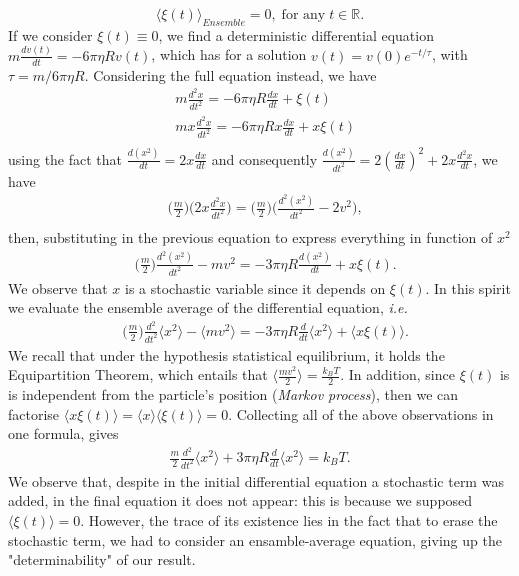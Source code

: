 \[
	\langle \xi(t)\rangle_{Ensemble}=0, \;\mathrm{for}\,\,\mathrm{any}\; t\in \mathbb{R}.
\]
If we consider $\xi(t)\equiv 0$, we find a deterministic differential equation $m\frac{dv(t)}{dt}=-6\pi\eta R v(t)$, which has for a solution $v(t)=v(0)e^{-t/\tau}$, with $\tau=m/6\pi\eta R$. Considering the full equation instead, we have
\begin{align*}
	&m\frac{d^2x}{dt^2}=-6\pi\eta R\frac{dx}{dt}+\xi(t)\\
	& mx\frac{d^2x}{dt^2}=-6\pi\eta Rx\frac{dx}{dt}+x\xi(t)\\
\end{align*}
using the fact that $\frac{d(x^2)}{dt}=2x\frac{dx}{dt}$ and consequently $\frac{d(x^2)}{dt^2}=2(\frac{dx}{dt})^2+2x\frac{d^2x}{dt}$, we have
\begin{align*}
	&\bigg(\frac{m}{2}\bigg)\bigg(2x\frac{d^2x}{dt^2}\bigg)=\bigg(\frac{m}{2}\bigg)\bigg(\frac{d^2(x^2)}{dt^2}-2v^2\bigg),\\
\end{align*}
then, substituting in the previous equation to express everything in function of $x^2$
\begin{align*}
	&\bigg(\frac{m}{2}\bigg)\frac{d^2(x^2)}{dt^2}-mv^2=-3\pi\eta R\frac{d(x^2)}{dt}+x\xi(t).
\end{align*}
We observe that $x$ is a stochastic variable since it depends on $\xi(t)$. In this spirit we evaluate the ensemble average of the differential equation, \textit{i.e.}
\begin{align*}
	&\bigg(\frac{m}{2}\bigg)\frac{d^2}{dt^2}\langle x^2 \rangle-\langle mv^2\rangle =-3\pi\eta R\frac{d}{dt}\langle x^2\rangle +\langle x\xi(t)\rangle.
\end{align*}
We recall that under the hypothesis statistical equilibrium, it holds the Equipartition Theorem, which entails that $\langle \frac{mv^2}{2}\rangle=\frac{k_BT}{2}$. In addition, since $\xi(t)$ is is independent from the particle's position (\textit{Markov process}), then we can factorise $\langle x\xi(t)\rangle =\langle x\rangle \langle \xi(t)\rangle=0$. Collecting all of the above observations in one formula, gives
\begin{align*}
	\frac{m}{2}\frac{d^2}{dt^2}\langle x^2 \rangle +3\pi\eta R\frac{d}{dt}\langle x^2\rangle =k_BT.
\end{align*}
We observe that, despite in the initial differential equation a stochastic term was added, in the final equation it does not appear: this is because we supposed $\langle \xi(t)\rangle =0$. However, the trace of its existence lies in the fact that to erase the stochastic term, we had to consider an ensamble-average equation, giving up the "determinability" of our result.\\
